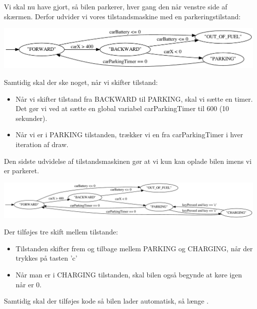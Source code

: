 \documentclass{ucph-handout}
\begin{document}
\newpage
\begin{exercisebox}[adjusted title=Udvidet tilstandsmaskine]
Vi skal nu have gjort, så bilen parkerer, hver gang den når venstre side
af skærmen. Derfor udvider vi vores tilstandsmaskine med en
parkeringstilstand:
\begin{center}
\includegraphics[width=\textwidth]{../illustrations/graphviz/carStateMachine_parking}
\end{center}

\noindent
Samtidig skal der ske noget, når vi skifter tilstand:
\begin{itemize}
\item Når vi skifter tilstand fra BACKWARD til PARKING, skal vi sætte
  en timer. Det gør vi ved at sætte en global variabel carParkingTimer
  til 600 (10 sekunder).
\item Når vi er i PARKING tilstanden, trækker vi en fra carParkingTimer
  i hver iteration af draw.
\end{itemize}
\end{exercisebox}

\begin{exercisebox}[adjusted title=Kun opladning når der er parkeret]
Den sidste udvidelse af tilstandsmaskinen gør at vi kun kan oplade
bilen imens vi er parkeret.

\hspace{-3cm}
\includegraphics[width=1.45\textwidth]{../illustrations/graphviz/carStateMachine_charging}

\noindent
Der tilføjes tre skift mellem tilstande:
\begin{itemize}
\item Tilstanden skifter frem og tilbage mellem PARKING og CHARGING,
  når der trykkes på tasten 'c'
\item Når man er i CHARGING tilstanden, skal bilen også begynde at
  køre igen når  er 0.
\end{itemize}

\noindent
Samtidig skal der tilføjes kode så bilen lader automatisk, så længe
.
\end{exercisebox}
\end{document}

